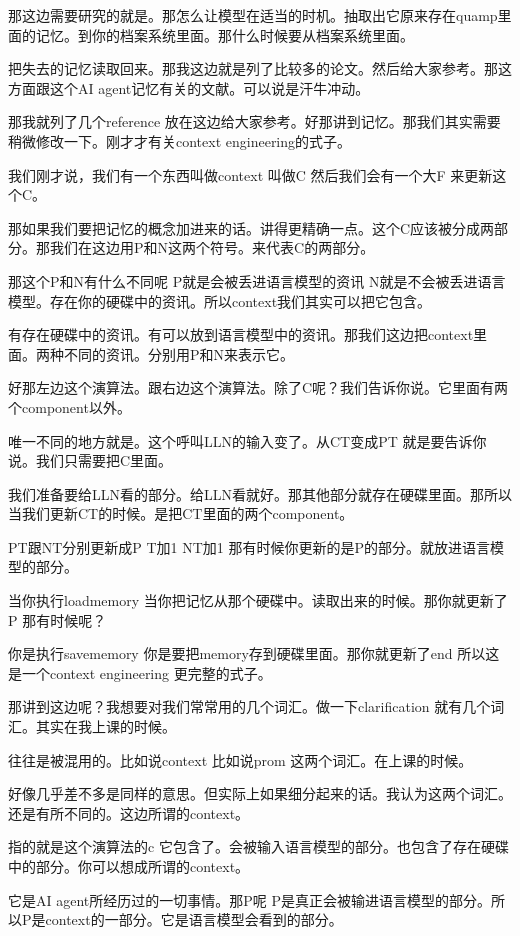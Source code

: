 \documentclass[12pt,a4paper]{article}
\begin{document}
那这边需要研究的就是。那怎么让模型在适当的时机。抽取出它原来存在quamp里面的记忆。到你的档案系统里面。那什么时候要从档案系统里面。

把失去的记忆读取回来。那我这边就是列了比较多的论文。然后给大家参考。那这方面跟这个AI agent记忆有关的文献。可以说是汗牛冲动。

那我就列了几个reference 放在这边给大家参考。好那讲到记忆。那我们其实需要稍微修改一下。刚才才有关context engineering的式子。

我们刚才说，我们有一个东西叫做context 叫做C 然后我们会有一个大F 来更新这个C。

那如果我们要把记忆的概念加进来的话。讲得更精确一点。这个C应该被分成两部分。那我们在这边用P和N这两个符号。来代表C的两部分。

那这个P和N有什么不同呢 P就是会被丢进语言模型的资讯 N就是不会被丢进语言模型。存在你的硬碟中的资讯。所以context我们其实可以把它包含。

有存在硬碟中的资讯。有可以放到语言模型中的资讯。那我们这边把context里面。两种不同的资讯。分别用P和N来表示它。

好那左边这个演算法。跟右边这个演算法。除了C呢？我们告诉你说。它里面有两个component以外。

唯一不同的地方就是。这个呼叫LLN的输入变了。从CT变成PT 就是要告诉你说。我们只需要把C里面。

我们准备要给LLN看的部分。给LLN看就好。那其他部分就存在硬碟里面。那所以当我们更新CT的时候。是把CT里面的两个component。

PT跟NT分别更新成P T加1 NT加1 那有时候你更新的是P的部分。就放进语言模型的部分。

当你执行loadmemory 当你把记忆从那个硬碟中。读取出来的时候。那你就更新了P 那有时候呢？

你是执行savememory 你是要把memory存到硬碟里面。那你就更新了end 所以这是一个context engineering 更完整的式子。

那讲到这边呢？我想要对我们常常用的几个词汇。做一下clarification 就有几个词汇。其实在我上课的时候。

往往是被混用的。比如说context 比如说prom 这两个词汇。在上课的时候。

好像几乎差不多是同样的意思。但实际上如果细分起来的话。我认为这两个词汇。还是有所不同的。这边所谓的context。

指的就是这个演算法的c 它包含了。会被输入语言模型的部分。也包含了存在硬碟中的部分。你可以想成所谓的context。

它是AI agent所经历过的一切事情。那P呢 P是真正会被输进语言模型的部分。所以P是context的一部分。它是语言模型会看到的部分。
\end{document}
